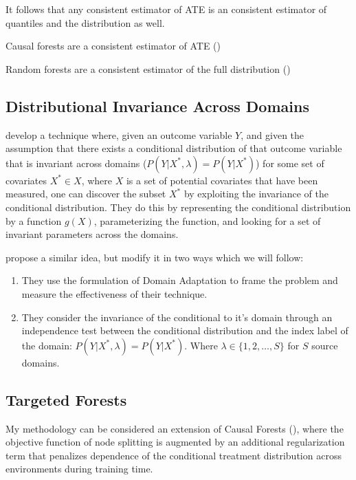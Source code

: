 \documentclass[a4paper,12pt]{article}
\begin{document}
It follows that any consistent estimator of ATE is an consistent estimator of quantiles and the distribution as well. 

Causal forests are a consistent estimator of ATE (\cite{})

Random forests are a consistent estimator of the full distribution (\cite{})


\subsection*{Distributional Invariance Across Domains}

\cite{Peters2015} develop a technique where, given an outcome variable $Y$, and given the assumption that there exists a conditional distribution of that outcome variable that is invariant across domains ($P(Y | X^*, \lambda) = P(Y | X^*)$) for some set of covariates $X^* \in X$, where $X$ is a set of potential covariates that have been measured, one can discover the subset $X^*$ by exploiting the invariance of the conditional distribution. They do this by representing the conditional distribution by a function $g(X)$, parameterizing the function, and looking for a set of invariant parameters across the domains. 

\cite{Rojas-carulla2018} propose a similar idea, but modify it in two ways which we will follow: 

\begin{enumerate}
\item They use the formulation of Domain Adaptation to frame the problem and measure the effectiveness of their technique. 
\item They consider the invariance of the conditional to it's domain through an independence test between the conditional distribution and the index label of the domain: $P(Y | X^*, \lambda) = P(Y | X^*)$. Where $\lambda \in \{1,2,\ldots,S \}$ for $S$ source domains. 

\end{enumerate}

\subsection*{Targeted Forests}

My methodology can be considered an extension of Causal Forests (\cite{}), where the objective function of node splitting is augmented by an additional regularization term that penalizes dependence of the conditional treatment distribution across environments during training time. 
\end{document}
